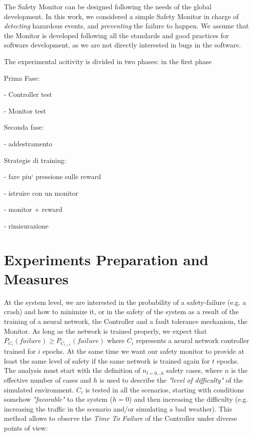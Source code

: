 The Safety Monitor can be designed following the needs of the global development. In this work, we considered a simple Safety Monitor in charge of \textsl{detecting} hazardous events, and \textsl{preventing} the failure to happen. We assume that the Monitor is developed following all the standards and good practices for software development, as we are not directly interested in bugs in the software.






The experimental acitivity is divided in two phases: in the first phase


Prima Fase:

- Controller test

- Monitor test

Seconda fase:

- addestramento

Strategie di training:

- fare piu` pressione sulle reward

- istruire con un monitor

- monitor + reward

- rimisurazione






\section{Experiments Preparation and Measures}

At the system level, we are interested in the probability of a safety-failure (e.g. a crash) and how to minimize it, or in the safety of the system as a result of the training of a neural network, the Controller and a fault tolerance mechanism, the Monitor. As long as the network is trained properly, we expect that $P_{C_{i}}(failure) \geq P_{C_{i+t}}(failure)$ where $C_{i}$ represents a neural network controller trained for $i$ epochs. At the same time we want our safety monitor to provide at least the same level of safety if the same network is trained again for $t$ epochs.\newline
The analysis must start with the definition of $n_{l=0\dots h}$ safety cases, where $n$ is the effective number of cases and $h$ is used to describe the \textsl{"level of difficulty"} of the simulated environment. $C_{i}$ is tested in all the scenarios, starting with conditions somehow \textsl{"favorable"} to the system ($h=0$) and then increasing the difficulty (e.g. increasing the traffic in the scenario and/or simulating a bad weather). This method allows to observe the \textsl{Time To Failure} of the Controller under diverse points of view:


